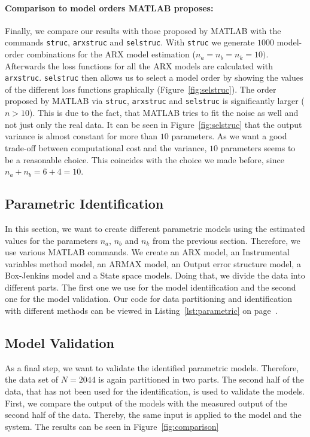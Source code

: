 \paragraph{Comparison to model orders MATLAB proposes:} Finally, we compare our results with those proposed by MATLAB with the commands \texttt{struc}, \texttt{arxstruc} and \texttt{selstruc}. 
With \texttt{struc} we generate $1000$ model-order combinations for the ARX model estimation ($n_a = n_b = n_k = 10)$. Afterwards the loss functions for all the ARX models are calculated with \texttt{arxstruc}. \texttt{selstruc} then allows us to select a model order by showing the values of the different loss functions graphically (Figure~\ref{fig:selstruc}). 
The order proposed by MATLAB via \texttt{struc}, \texttt{arxstruc} and \texttt{selstruc} is significantly larger ($n > 10$). 
This is due to the fact, that MATLAB tries to fit the noise as well and not just only the real data. 
It can be seen in Figure~\ref{fig:selstruc} that the output variance is almost constant for more than $10$ parameters.
As we want a good trade-off between computational cost and the variance, $10$ parameters seems to be a reasonable choice.
This coincides with the choice we made before, since $n_a + n_b = 6 + 4 = 10$. 

\subsection{Parametric Identification}
In this section, we want to create different parametric models using the estimated values for the parameters $n_a$, $n_b$ and $n_k$ from the previous section. 
Therefore, we use various MATLAB commands. 
We create an ARX model, an Instrumental variables method model, an ARMAX model, an Output error structure model, a Box-Jenkins model and a State space models.
Doing that, we divide the data into different parts. 
The first one we use for the model identification and the second one for the model validation. 
Our code for data partitioning and identification with different methods can be viewed in Listing~\ref{lst:parametric} on page~\pageref{lst:parametric}.

\subsection{Model Validation}
As a final step, we want to validate the identified parametric models. Therefore, the data set of $N = 2044$ is again partitioned in two parts. The second half of the data, that has not been used for the identification, is used to validate the models. \\
First, we compare the output of the models with the measured output of the second half of the data.  Thereby, the same input is applied to the model and the system. The results can be seen in Figure~\ref{fig:comparison}

